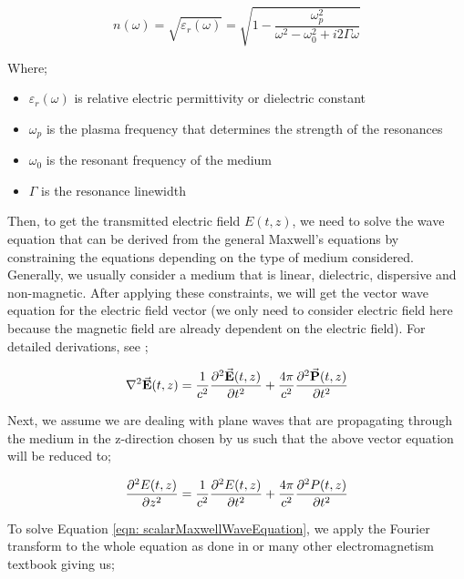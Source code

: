 \begin{equation}
    n(\omega) = \sqrt{\varepsilon_{r}(\omega)} = \sqrt{1 - \frac{\omega_{p}^{2}}{\omega^{2} - \omega_{0}^{2} + i2\Gamma\omega}}
    \label{eqn: nw}
\end{equation}

\newpage

Where;

\begin{itemize}
    \item $\varepsilon_{r}(\omega)$ is relative electric permittivity or dielectric constant
    \item $\omega_{p}$ is the plasma frequency that determines the strength of the resonances
    \item $\omega_{0}$ is the resonant frequency of the medium
    \item $\Gamma$ is the resonance linewidth
\end{itemize}

Then, to get the transmitted electric field $E(t, z)$, we need to solve the wave equation that can be derived from the general Maxwell's equations by constraining the equations depending on the type of medium considered. Generally, we usually consider a medium that is linear, dielectric, dispersive and non-magnetic. After applying these constraints, we will get the vector wave equation for the electric field vector (we only need to consider electric field here because the magnetic field are already dependent on the electric field). For detailed derivations, see \cite{jackson1999classical};

\begin{equation}
    \laplacian{\va{E}(t, z)} = \frac{1}{c^2} \pdv[2]{\va{E}(t, z)}{t} + \frac{4\pi}{c^2} \pdv[2]{\va{P}(t, z)}{t}
\end{equation}

Next, we assume we are dealing with plane waves that are propagating through the medium in the z-direction chosen by us such that the above vector equation will be reduced to;

\begin{equation}
    \pdv[2]{E(t, z)}{z} = \frac{1}{c^2} \pdv[2]{E(t, z)}{t} + \frac{4\pi}{c^2} \pdv[2]{P(t, z)}{t}
    \label{eqn: scalarMaxwellWaveEquation}
\end{equation}

To solve Equation \ref{eqn: scalarMaxwellWaveEquation}, we apply the Fourier transform to the whole equation as done in \cite{jackson1999classical} or many other electromagnetism textbook giving us;

